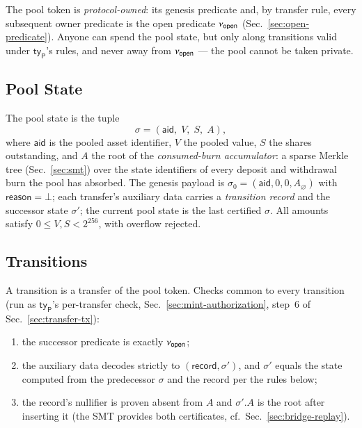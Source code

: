 The pool token is \emph{protocol-owned}: its genesis predicate and, by transfer rule, every subsequent owner predicate is the open predicate $\nu_\mathsf{open}$ (Sec.~\ref{sec:open-predicate}). Anyone can spend the pool state, but only along transitions valid under $\mathsf{ty}_\mathsf{P}$'s rules, and never away from $\nu_\mathsf{open}$ --- the pool cannot be taken private.

\subsection{Pool State}

The pool state is the tuple
\[
\sigma = (\mathsf{aid},\; V,\; S,\; A),
\]
where $\mathsf{aid}$ is the pooled asset identifier, $V$ the pooled value, $S$ the shares outstanding, and $A$ the root of the \emph{consumed-burn accumulator}: a sparse Merkle tree (Sec.~\ref{sec:smt}) over the state identifiers of every deposit and withdrawal burn the pool has absorbed. The genesis payload is $\sigma_0 = (\mathsf{aid}, 0, 0, A_\varnothing)$ with $\mathsf{reason} = \bot$; each transfer's auxiliary data carries a \emph{transition record} and the successor state $\sigma'$; the current pool state is the last certified $\sigma$. All amounts satisfy $0 \le V, S < 2^{256}$, with overflow rejected.

\subsection{Transitions}

A transition is a transfer of the pool token. Checks common to every transition (run as $\mathsf{ty}_\mathsf{P}$'s per-transfer check, Sec.~\ref{sec:mint-authorization}, step~6 of Sec.~\ref{sec:transfer-tx}):
\begin{enumerate}
	\item the successor predicate is exactly $\nu_\mathsf{open}$;
	\item the auxiliary data decodes strictly to $(\mathsf{record}, \sigma')$, and $\sigma'$ equals the state computed from the predecessor $\sigma$ and the record per the rules below;
	\item the record's nullifier is proven absent from $A$ and $\sigma'.A$ is the root after inserting it (the SMT provides both certificates, cf.\ Sec.~\ref{sec:bridge-replay}).
\end{enumerate}

